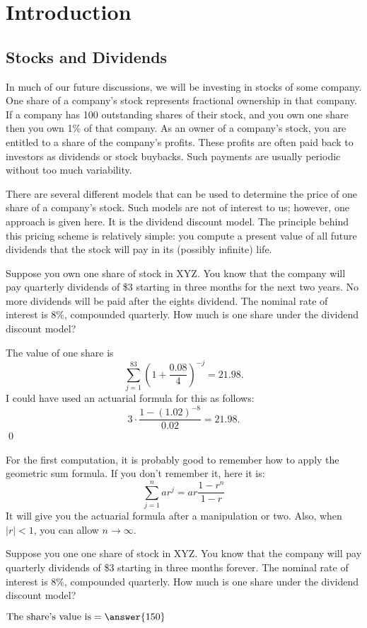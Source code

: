 \documentclass{ximera}
\begin{document}
\chapter{Introduction}

\section{Stocks and Dividends}

In much of our future discussions, we will be investing in stocks of some company. One share of a company's stock represents fractional ownership in that company. If a company has 100 outstanding shares of their stock, and you own one share then you own 1\% of that company. As an owner of a company's stock, you are entitled to a share of the company's profits. These profits are often paid back to investors as dividends or stock buybacks. Such payments are usually periodic without too much variability. 

There are several different models that can be used to determine the price of one share of a company's stock. Such models are not of interest to us; however, one approach is given here. It is the dividend discount model. The principle behind this pricing scheme is relatively simple: you compute a present value of all future dividends that the stock will pay in its (possibly infinite) life. 

\begin{example}
Suppose you own one share of stock in XYZ. You know that the company will pay quarterly dividends of \$3 starting in three months for the next two years. No more dividends will be paid after the eights dividend. The nominal rate of interest is 8\%, compounded quarterly. How much is one share under the dividend discount model?

The value of one share is
	\begin{equation*}
		\sum_{j=1}^83\left(1+\frac{0.08}{4}\right)^{-j}=21.98.
	\end{equation*}
I could have used an actuarial formula for this as follows:
	\begin{equation*}
		3\cdot\frac{1-(1.02)^{-8}}{0.02}=21.98.
	\end{equation*}
	\qed
\end{example}

For the first computation, it is probably good to remember how to apply the geometric sum formula. If you don't remember it, here it is:
\begin{equation*}
	\sum_{j=1}^nar^j=ar\frac{1-r^n}{1-r}
\end{equation*}
It will give you the actuarial formula after a manipulation or two. Also, when $|r|<1$, you can allow $n\to\infty$.
\begin{question}
Suppose you one one share of stock in XYZ. You know that the company will pay quarterly dividends of \$3 starting in three months forever. The nominal rate of interest is 8\%, compounded quarterly. How much is one share under the dividend discount model?
	\begin{prompt}
		$\text{The share's value is}=\answer{150}$
	\end{prompt}	
\end{question}
\end{document}
